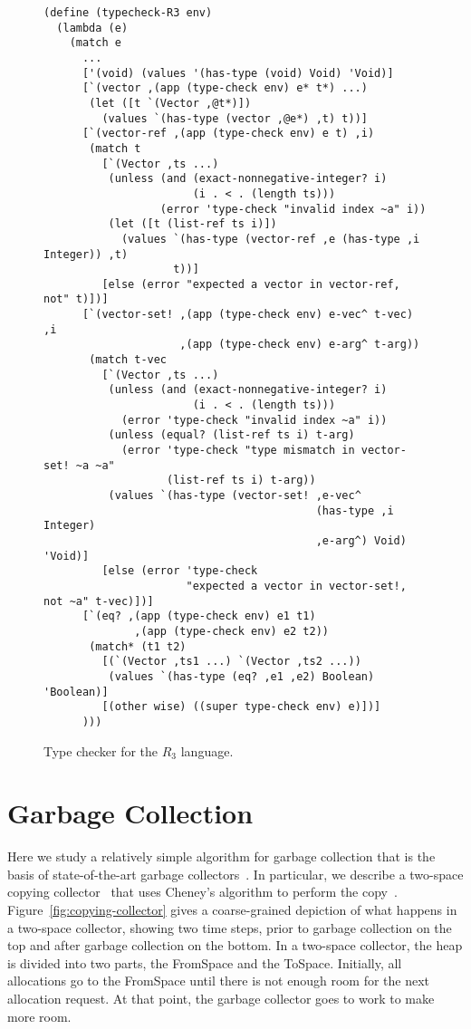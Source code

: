 \documentclass[11pt]{book}
\begin{document}
\begin{figure}[tbp]
\begin{lstlisting}
(define (typecheck-R3 env)
  (lambda (e)
    (match e
      ...
      ['(void) (values '(has-type (void) Void) 'Void)]
      [`(vector ,(app (type-check env) e* t*) ...)
       (let ([t `(Vector ,@t*)])
         (values `(has-type (vector ,@e*) ,t) t))]
      [`(vector-ref ,(app (type-check env) e t) ,i)
       (match t
         [`(Vector ,ts ...)
          (unless (and (exact-nonnegative-integer? i)
                       (i . < . (length ts)))
                  (error 'type-check "invalid index ~a" i))
          (let ([t (list-ref ts i)])
            (values `(has-type (vector-ref ,e (has-type ,i Integer)) ,t)
                    t))]
         [else (error "expected a vector in vector-ref, not" t)])]
      [`(vector-set! ,(app (type-check env) e-vec^ t-vec) ,i
                     ,(app (type-check env) e-arg^ t-arg))
       (match t-vec
         [`(Vector ,ts ...)
          (unless (and (exact-nonnegative-integer? i)
                       (i . < . (length ts)))
            (error 'type-check "invalid index ~a" i))
          (unless (equal? (list-ref ts i) t-arg)
            (error 'type-check "type mismatch in vector-set! ~a ~a"
                   (list-ref ts i) t-arg))
          (values `(has-type (vector-set! ,e-vec^
                                          (has-type ,i Integer)
                                          ,e-arg^) Void) 'Void)]
         [else (error 'type-check
                      "expected a vector in vector-set!, not ~a" t-vec)])]
      [`(eq? ,(app (type-check env) e1 t1)
              ,(app (type-check env) e2 t2))
       (match* (t1 t2)
         [(`(Vector ,ts1 ...) `(Vector ,ts2 ...))
          (values `(has-type (eq? ,e1 ,e2) Boolean) 'Boolean)]
         [(other wise) ((super type-check env) e)])]
      )))
\end{lstlisting}
\caption{Type checker for the $R_3$ language.}
\label{fig:typecheck-R3}
\end{figure}


\section{Garbage Collection}
\label{sec:GC}

Here we study a relatively simple algorithm for garbage collection
that is the basis of state-of-the-art garbage
collectors~\citep{Lieberman:1983aa,Ungar:1984aa,Jones:1996aa,Detlefs:2004aa,Dybvig:2006aa,Tene:2011kx}. In
particular, we describe a two-space copying
collector~\citep{Wilson:1992fk} that uses Cheney's algorithm to
perform the
copy~\citep{Cheney:1970aa}. Figure~\ref{fig:copying-collector} gives a
coarse-grained depiction of what happens in a two-space collector,
showing two time steps, prior to garbage collection on the top and
after garbage collection on the bottom. In a two-space collector, the
heap is divided into two parts, the FromSpace and the
ToSpace. Initially, all allocations go to the FromSpace until there is
not enough room for the next allocation request. At that point, the
garbage collector goes to work to make more room.
\end{document}
